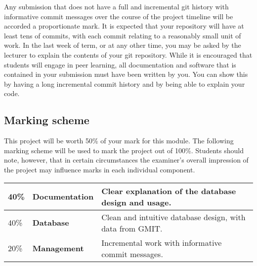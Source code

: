 \documentclass[12pt, a4paper]{article}
\begin{document}
Any submission that does not have a full and incremental git history with informative commit messages over the course of the project timeline will be accorded a proportionate mark.
It is expected that your repository will have at least tens of commits, with each commit relating to a reasonably small unit of work.
In the last week of term, or at any other time, you may be asked by the lecturer to explain the contents of your git repository.
While it is encouraged that students will engage in peer learning, all documentation and software that is contained in your submission must have been written by you.
You can show this by having a long incremental commit history and by being able to explain your code.

\subsection*{Marking scheme}
This project will be worth 50\% of your mark for this module.
The following marking scheme will be used to mark the project out of 100\%.
Students should note, however, that in certain circumstances the examiner's overall impression of the project may influence marks in each individual component.

\begin{center}
\begin{tabular}{llp{8.4cm}}
\toprule
40\% & \textbf{Documentation} & Clear explanation of the database design and usage.\\
\midrule
40\% & \textbf{Database} & Clean and intuitive database design, with data from GMIT. \\
\midrule
20\% & \textbf{Management} & Incremental work with informative commit messages. \\
\bottomrule
\end{tabular}
\end{center}
\end{document}
